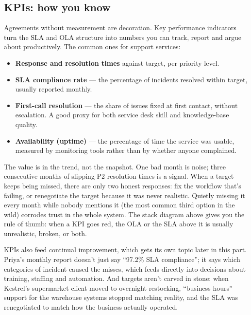\subsection{KPIs: how you know}


Agreements without measurement are decoration. Key performance indicators turn the SLA and OLA structure into numbers you can track, report and argue about productively. The common ones for support services:


\begin{itemize}[leftmargin=*]
\item \textbf{Response and resolution times} against target, per priority level.
\item \textbf{SLA compliance rate} — the percentage of incidents resolved within target, usually reported monthly.
\item \textbf{First-call resolution} — the share of issues fixed at first contact, without escalation. A good proxy for both service desk skill and knowledge-base quality.
\item \textbf{Availability (uptime)} — the percentage of time the service was usable, measured by monitoring tools rather than by whether anyone complained.
\end{itemize}

The value is in the trend, not the snapshot. One bad month is noise; three consecutive months of slipping P2 resolution times is a signal. When a target keeps being missed, there are only two honest responses: fix the workflow that's failing, or renegotiate the target because it was never realistic. Quietly missing it every month while nobody mentions it (the most common third option in the wild) corrodes trust in the whole system. The stack diagram above gives you the rule of thumb: when a KPI goes red, the OLA or the SLA above it is usually unrealistic, broken, or both.


KPIs also feed continual improvement, which gets its own topic later in this part. Priya's monthly report doesn't just say ``97.2\% SLA compliance''; it says which categories of incident caused the misses, which feeds directly into decisions about training, staffing and automation. And targets aren't carved in stone: when Kestrel's supermarket client moved to overnight restocking, ``business hours'' support for the warehouse systems stopped matching reality, and the SLA was renegotiated to match how the business actually operated.



